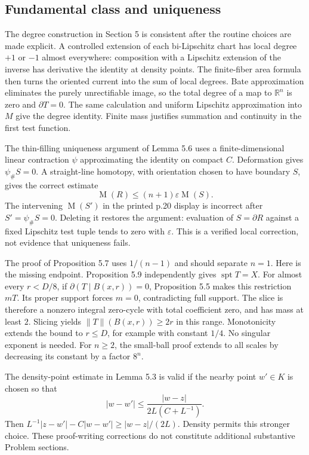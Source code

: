 \documentclass[10pt]{article}
\begin{document}
\subsection*{Fundamental class and uniqueness}
The degree construction in Section 5 is consistent after the routine choices are made explicit. A controlled extension of each bi-Lipschitz chart has local degree \(+1\) or \(-1\) almost everywhere: composition with a Lipschitz extension of the inverse has derivative the identity at density points. The finite-fiber area formula then turns the oriented current into the sum of local degrees. Bate approximation eliminates the purely unrectifiable image, so the total degree of a map to \(\mathbb R^n\) is zero and \(\partial T=0\). The same calculation and uniform Lipschitz approximation into \(M\) give the degree identity. Finite mass justifies summation and continuity in the first test function.\par
The thin-filling uniqueness argument of Lemma 5.6 uses a finite-dimensional linear contraction \(\psi\) approximating the identity on compact \(C\). Deformation gives \(\psi_\#S=0\). A straight-line homotopy, with orientation chosen to have boundary \(S\), gives the correct estimate \[\operatorname{M}(R)\le(n+1)\varepsilon\operatorname{M}(S).\] The intervening \(\operatorname{M}(S')\) in the printed p.20 display is incorrect after \(S'=\psi_\#S=0\). Deleting it restores the argument: evaluation of \(S=\partial R\) against a fixed Lipschitz test tuple tends to zero with \(\varepsilon\). This is a verified local correction, not evidence that uniqueness fails.\par
The proof of Proposition 5.7 uses \(1/(n-1)\) and should separate \(n=1\). Here is the missing endpoint. Proposition 5.9 independently gives \(\operatorname{spt}T=X\). For almost every \(r<D/8\), if \(\partial(T\mathbin{\vert}B(x,r))=0\), Proposition 5.5 makes this restriction \(mT\). Its proper support forces \(m=0\), contradicting full support. The slice is therefore a nonzero integral zero-cycle with total coefficient zero, and has mass at least \(2\). Slicing yields \(\|T\|(B(x,r))\ge2r\) in this range. Monotonicity extends the bound to \(r\le D\), for example with constant \(1/4\). No singular exponent is needed. For \(n\ge2\), the small-ball proof extends to all scales by decreasing its constant by a factor \(8^n\).\par
The density-point estimate in Lemma 5.3 is valid if the nearby point \(w'\in K\) is chosen so that \[|w-w'|\le
   \frac{|w-z|}{2L(C+L^{-1})}.\] Then \(L^{-1}|z-w'|-C|w-w'|\ge|w-z|/(2L)\). Density permits this stronger choice. These proof-writing corrections do not constitute additional substantive Problem sections.\par
\end{document}
